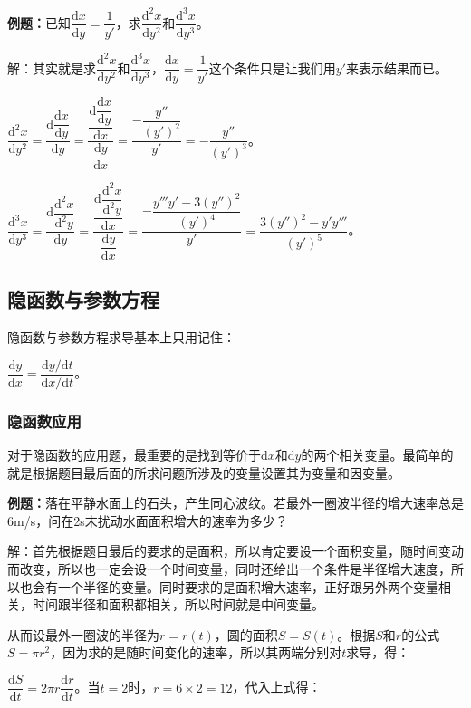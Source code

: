 \textbf{例题：}已知$\dfrac{\textrm{d}x}{\textrm{d}y}=\dfrac{1}{y'}$，求$\dfrac{\textrm{d}^2x}{\textrm{d}y^2}$和$\dfrac{\textrm{d}^3x}{\textrm{d}y^3}$。

解：其实就是求$\dfrac{\textrm{d}^2x}{\textrm{d}y^2}$和$\dfrac{\textrm{d}^3x}{\textrm{d}y^3}$，$\dfrac{\textrm{d}x}{\textrm{d}y}=\dfrac{1}{y'}$这个条件只是让我们用$y'$来表示结果而已。

$\dfrac{\textrm{d}^2x}{\textrm{d}y^2}=\dfrac{\textrm{d}\dfrac{\textrm{d}x}{\textrm{d}y}}{\textrm{d}y}=\dfrac{\dfrac{\textrm{d}\dfrac{\textrm{d}x}{\textrm{d}y}}{\textrm{d}x}}{\dfrac{\textrm{d}y}{\textrm{d}x}}=\dfrac{-\dfrac{y''}{(y')^2}}{y'}=-\dfrac{y''}{(y')^3}$。\medskip

$\dfrac{\textrm{d}^3x}{\textrm{d}y^3}=\dfrac{\textrm{d}\dfrac{\textrm{d}^2x}{\textrm{d}^2y}}{\textrm{d}y}=\dfrac{\dfrac{\textrm{d}\dfrac{\textrm{d}^2x}{\textrm{d}^2y}}{\textrm{d}x}}{\dfrac{\textrm{d}y}{\textrm{d}x}}=\dfrac{-\dfrac{y'''y'-3(y'')^2}{(y')^4}}{y'}=\dfrac{3(y'')^2-y'y'''}{(y')^5}$。

\subsection{隐函数与参数方程}

隐函数与参数方程求导基本上只用记住：\medskip

$\dfrac{\textrm{d}y}{\textrm{d}x}=\dfrac{\textrm{d}y/\textrm{d}t}{\textrm{d}x/\textrm{d}t}$。

\subsubsection{隐函数应用}

对于隐函数的应用题，最重要的是找到等价于$\textrm{d}x$和$\textrm{d}y$的两个相关变量。最简单的就是根据题目最后面的所求问题所涉及的变量设置其为变量和因变量。

\textbf{例题：}落在平静水面上的石头，产生同心波纹。若最外一圈波半径的增大速率总是6m/s，问在2s末扰动水面面积增大的速率为多少？

解：首先根据题目最后的要求的是面积，所以肯定要设一个面积变量，随时间变动而改变，所以也一定会设一个时间变量，同时还给出一个条件是半径增大速度，所以也会有一个半径的变量。同时要求的是面积增大速率，正好跟另外两个变量相关，时间跟半径和面积都相关，所以时间就是中间变量。

从而设最外一圈波的半径为$r=r(t)$，圆的面积$S=S(t)$。根据$S$和$r$的公式$S=\pi r^2$，因为求的是随时间变化的速率，所以其两端分别对$t$求导，得：

$\dfrac{\textrm{d}S}{\textrm{d}t}=2\pi r\dfrac{\textrm{d}r}{\textrm{d}t}$。当$t=2$时，$r=6\times2=12$，代入上式得：\medskip

